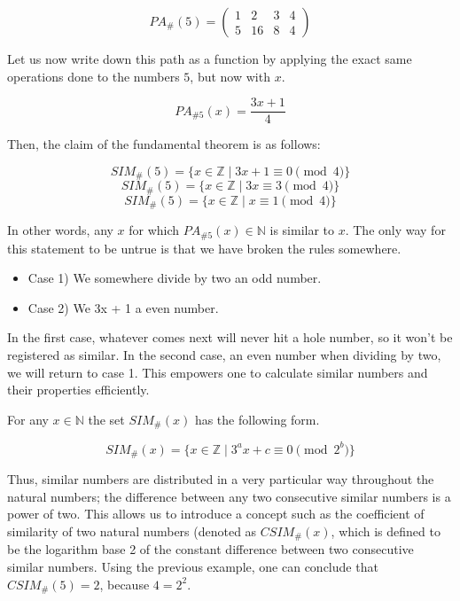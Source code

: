 \documentclass{article}
\begin{document}
\begin{equation}
  PA_\#(5) = 
\begin{pmatrix}
  1 &  2 & 3 & 4 \\
  5 & 16 & 8 & 4
\end{pmatrix}
\end{equation}

Let us now write down this path as a function by applying the exact same operations done to the numbers \(5\), but now with \(x\).

\begin{equation}
  PA_{\#5}(x) = \frac{3x + 1}{4}
\end{equation}

Then, the claim of the fundamental theorem is as follows:

\begin{equation}
  SIM_{\#}(5) = \{ x \in \mathbb{Z} \mid 3x + 1 \equiv 0 \pmod{4} \}
\end{equation}
\begin{equation}
  SIM_{\#}(5) = \{ x \in \mathbb{Z} \mid 3x \equiv 3 \pmod{4} \}
\end{equation}
\begin{equation}
  SIM_{\#}(5) = \{ x \in \mathbb{Z} \mid x \equiv 1 \pmod{4} \}
\end{equation}

In other words, any \(x\) for which \(PA_{\#5}(x) \in \mathbb{N}\) is similar to \(x\). The only way for this statement to be untrue is that we have broken the rules somewhere.

\begin{itemize}
  \item Case 1) We somewhere divide by two an odd number.
  \item Case 2) We 3x + 1 a even number.
  \end{itemize}

In the first case, whatever comes next will never hit a hole number, so it won't be registered as similar. In the second case, an even number when dividing by two, we will return to case 1. This empowers one to calculate similar numbers and their properties efficiently.

For any \(x \in \mathbb{N}\) the set \(SIM_\#(x)\) has the following form.

\begin{equation}
	SIM_\#(x) = \{x \in \mathbb{Z} \mid 3^a x + c \equiv 0 \pmod{2^b}\}
\end{equation}

Thus, similar numbers are distributed in a very particular way throughout the natural numbers; the difference between any two consecutive similar numbers is a power of two. This allows us to introduce a concept such as the coefficient of similarity of two natural numbers (denoted as \(CSIM_\#(x)\), which is defined to be the logarithm base 2 of the constant difference between two consecutive similar numbers. Using the previous example, one can conclude that \(CSIM_\#(5) = 2\), because \(4 = 2^2\).
\end{document}
